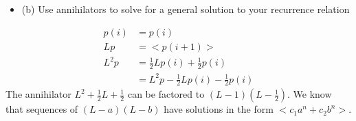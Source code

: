 \documentclass{article}
\begin{document}
\begin{enumerate}
\begin{itemize}
    \item (b) Use annihilators to solve for a general solution to your recurrence relation
\end{itemize}
\begin{align*}
    p(i) & = p(i) \\
    Lp & = <p(i+1)> \\
    L^2p & = \frac{1}{2}Lp(i) + \frac{1}{2}p(i) \\
    & = L^2p - \frac{1}{2}Lp(i) - \frac{1}{2}p(i)
\end{align*}
The annihilator $L^2 + \frac{1}{2}L + \frac{1}{2}$ can be factored to $(L-1)(L-\frac{1}{2})$. We know that sequences of $(L-a)(L-b)$ have solutions in the form $<c_1a^n + c_2b^n>$.










\end{enumerate}
\end{document}
